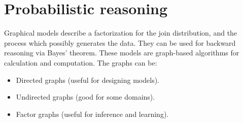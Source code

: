 \documentclass[12pt, a4paper]{report}
\newtheorem[style=M,bodystyle=\normalfont]{theorem}{Theorem}
\newtheorem[style=M,bodystyle=\normalfont]{corollary}{Corollary}
\newtheorem[style=M,bodystyle=\normalfont]{lemma}{Lemma}
\newtheorem[style=M,bodystyle=\normalfont]{definition}{Definition}
\begin{document}
    \section{Probabilistic reasoning}
    Graphical models describe a factorization for the join distribution, and the process which possibly generates the data. They can be used for backward reasoning via Bayes' theorem.
    These models are graph-based algorithms for calculation and computation. The graphs can be: 
    \begin{itemize}
        \item Directed graphs (useful for designing models).
        \item Undirected graphs (good for some domains).
        \item Factor graphs (useful for inference and learning).
    \end{itemize}
\end{document}
